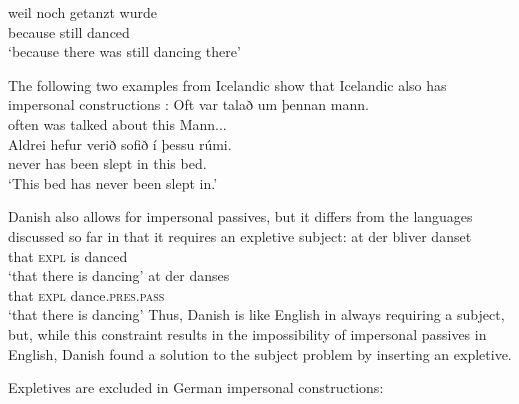 \ea
\gll weil    noch  getanzt wurde\\
     because still danced  \AUX\\\german
\glt `because there was still dancing there'
\z

\noindent
The following two examples from Icelandic show that Icelandic also has impersonal constructions \citep[]{Thrainsson2007a-u}:
\eal
\ex 
\gll Oft var   talað      um   þennan mann.\\
     often was talked about this Mann.\ACC.\SG.\M\\\icelandic
\ex
\gll Aldrei hefur verið    sofið      í  þessu  rúmi.\\
     never    has   been slept in this bed.\DAT\\
\glt `This bed has never been slept in.'
\zl

\noindent
Danish also allows for impersonal passives, but it differs from the languages discussed so far in
that it requires an expletive subject:
\eal
\ex 
\gll at der bliver danset\\
     that \textsc{expl} is danced\\\danish
\glt `that there is dancing'
\ex
\gll at der danses\\
     that \textsc{expl} dance.\textsc{pres}.\textsc{pass}\\
\glt `that there is dancing'
\zl
Thus, Danish is like English in always requiring a subject, but, while this constraint results in the
impossibility of impersonal passives in English, Danish found a solution to the subject problem by
inserting an expletive.

Expletives are excluded in German impersonal constructions:
\nocite{MOe2011a}
\z
{}


